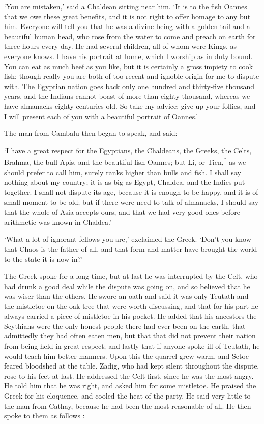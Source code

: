 \documentclass{article}
\begin{document}
\begin{center}
`You are mistaken,' said a Chaldean sitting near him. `It is to the fish Oannes 
that we owe these great benefits, and it is not right to offer homage to any but 
him. Everyone will tell you that he was a divine being with a golden tail and a 
beautiful human head, who rose from the water to come and preach on earth for three 
hours every day. He had several children, all of whom were Kings, as everyone knows. 
I have his portrait at home, which I worship as in duty bound. You can eat as much 
beef as you like, but it is certainly a gross impiety to cook fish; though really 
you are both of too recent and ignoble origin for me to dispute with. The Egyptian 
nation goes back only one hundred and thirty-five thousand years, and the Indians 
cannot boast of more than eighty thousand, whereas we have almanacks eighty centuries 
old. So take my advice: give up your follies, and I will present each of you with 
a beautiful portrait of Oannes.' 

The man from Cambalu then began to speak, and said: 

`I have a great respect for the Egyptians, the Chaldeans, the Greeks, the Celts, 
Brahma, the bull Apis, and the beautiful fish Oannes; but Li, or Tien,\textsuperscript{*} 
as we should prefer to call him, surely ranks higher than bulls and fish. I shall 
say nothing about my country; it is as big as Egypt, Chaldea, and the Indies put 
together. I shall not dispute its age, because it is enough to be happy, and it 
is of small moment to be old; but if there were need to talk of almanacks, I should 
say that the whole of Asia accepts ours, and that we had very good ones before 
arithmetic was known in Chaldea.' 

`What a lot of ignorant fellows you are,' exclaimed the Greek. `Don't you know 
that Chaos is the father of all, and that form and matter have brought the world 
to the state it is now in?' 

The Greek spoke for a long time, but at last he was interrupted by the Celt, who 
had drunk a good deal while the dispute was going on, and so believed that he was 
wiser than the others. He swore an oath and said it was only Teutath and the mistletoe 
on the oak tree that were worth discussing, and that for his part he always carried 
a piece of mistletoe in his pocket. He added that his ancestors the Scythians were 
the only honest people there had ever been on the earth, that admittedly they had 
often eaten men, but that that did not prevent their nation from being held in 
great respect; and lastly that if anyone spoke ill of Teutath, he would teach him 
better manners. Upon this the quarrel grew warm, and Setoc feared bloodshed at 
the table. Zadig, who had kept silent throughout the dispute, rose to his feet 
at last. He addressed the Celt first, since he was the most angry. He told him 
that he was right, and asked him for some mistletoe. He praised the Greek for his 
eloquence, and cooled the heat of the party. He said very little to the man from 
Cathay, because he had been the most reasonable of all. He then spoke to them as 
follows : 


\end{center}
\end{document}
